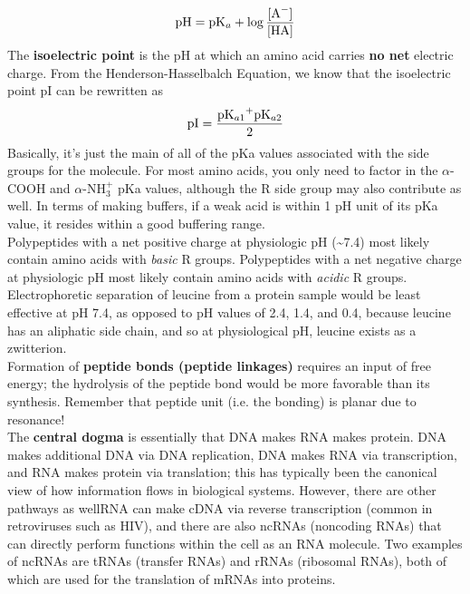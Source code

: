 \documentclass{article}
\theoremstyle{plain}%
\theoremstyle{definition}
\theoremstyle{remark}
\begin{document}
\begin{equation}
\begin{split}
\ce{pH}=\ce{pK_a}+\log\frac{\ce{[A^-]}}{\ce{[HA]}}
\end{split}
\end{equation}
\noindent The \textbf{isoelectric point} is the pH at which an amino acid carries \textbf{no net} electric charge. From the Henderson-Hasselbalch Equation, we know that the isoelectric point pI can be rewritten as
\begin{equation}
\begin{split}
\ce{pI}=\frac{\ce{pK_{a1}+pK_{a2}}}{2}
\end{split}
\end{equation}
\noindent Basically, it's just the main of all of the pKa values associated with the side groups for the molecule. For most amino acids, you only need to factor in the $\alpha$-COOH and $\alpha$-N$\text{H}_3^+$ pKa values, although the R side group may also contribute as well. In terms of making buffers, if a weak acid is within 1 pH unit of its pKa value, it resides within a good buffering range.\\
\indent Polypeptides with a net positive charge at physiologic pH (\textasciitilde7.4) most likely contain amino acids with \textit{basic} R groups. Polypeptides with a net negative charge at physiologic pH most likely contain amino acids with \textit{acidic} R groups. \\
\indent Electrophoretic separation of leucine from a protein sample would be least effective at pH 7.4, as opposed to pH values of 2.4, 1.4, and 0.4, because leucine has an aliphatic side chain, and so at physiological pH, leucine exists as a zwitterion. \\
\indent Formation of \textbf{peptide bonds (peptide linkages)} requires an input of free energy; the hydrolysis of the peptide bond would be more favorable than its synthesis. Remember that peptide unit (i.e. the  bonding) is planar due to resonance!\\
\indent The \textbf{central dogma} is essentially that DNA makes RNA makes protein. DNA makes additional DNA via DNA replication, DNA makes RNA via transcription, and RNA makes protein via translation; this has typically been the canonical view of how information flows in biological systems. However, there are other pathways as well\textemdash RNA can make cDNA via reverse transcription (common in retroviruses such as HIV), and there are also ncRNAs (noncoding RNAs) that can directly perform functions within the cell as an RNA molecule. Two examples of ncRNAs are tRNAs (transfer RNAs) and rRNAs (ribosomal RNAs), both of which are used for the translation of mRNAs into proteins. \\
\end{document}

